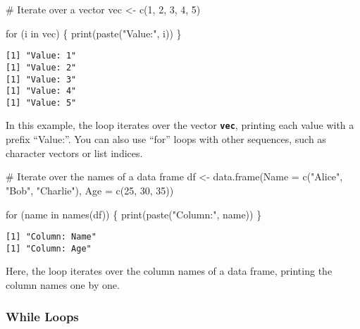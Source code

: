 \documentclass[
  letterpaper,
  DIV=11,
  numbers=noendperiod]{scrartcl}
\newenvironment{Shaded}{\begin{snugshade}}{\end{snugshade}}
\newcommand{\AttributeTok}[1]{\textcolor[rgb]{0.40,0.45,0.13}{#1}}
\newcommand{\CommentTok}[1]{\textcolor[rgb]{0.37,0.37,0.37}{#1}}
\newcommand{\ControlFlowTok}[1]{\textcolor[rgb]{0.00,0.23,0.31}{#1}}
\newcommand{\DecValTok}[1]{\textcolor[rgb]{0.68,0.00,0.00}{#1}}
\newcommand{\FunctionTok}[1]{\textcolor[rgb]{0.28,0.35,0.67}{#1}}
\newcommand{\NormalTok}[1]{\textcolor[rgb]{0.00,0.23,0.31}{#1}}
\newcommand{\OtherTok}[1]{\textcolor[rgb]{0.00,0.23,0.31}{#1}}
\newcommand{\StringTok}[1]{\textcolor[rgb]{0.13,0.47,0.30}{#1}}
\begin{document}
\begin{Shaded}
\begin{Highlighting}[]
\CommentTok{\# Iterate over a vector}
\NormalTok{vec }\OtherTok{\textless{}{-}} \FunctionTok{c}\NormalTok{(}\DecValTok{1}\NormalTok{, }\DecValTok{2}\NormalTok{, }\DecValTok{3}\NormalTok{, }\DecValTok{4}\NormalTok{, }\DecValTok{5}\NormalTok{)}

\ControlFlowTok{for}\NormalTok{ (i }\ControlFlowTok{in}\NormalTok{ vec) \{}
  \FunctionTok{print}\NormalTok{(}\FunctionTok{paste}\NormalTok{(}\StringTok{"Value:"}\NormalTok{, i))}
\NormalTok{\}}
\end{Highlighting}
\end{Shaded}

\begin{verbatim}
[1] "Value: 1"
[1] "Value: 2"
[1] "Value: 3"
[1] "Value: 4"
[1] "Value: 5"
\end{verbatim}

In this example, the loop iterates over the vector
\textbf{\texttt{vec}}, printing each value with a prefix ``Value:''. You
can also use ``for'' loops with other sequences, such as character
vectors or list indices.

\begin{Shaded}
\begin{Highlighting}[]
\CommentTok{\# Iterate over the names of a data frame}
\NormalTok{df }\OtherTok{\textless{}{-}} \FunctionTok{data.frame}\NormalTok{(}\AttributeTok{Name =} \FunctionTok{c}\NormalTok{(}\StringTok{"Alice"}\NormalTok{, }\StringTok{"Bob"}\NormalTok{, }\StringTok{"Charlie"}\NormalTok{), }\AttributeTok{Age =} \FunctionTok{c}\NormalTok{(}\DecValTok{25}\NormalTok{, }\DecValTok{30}\NormalTok{, }\DecValTok{35}\NormalTok{))}

\ControlFlowTok{for}\NormalTok{ (name }\ControlFlowTok{in} \FunctionTok{names}\NormalTok{(df)) \{}
  \FunctionTok{print}\NormalTok{(}\FunctionTok{paste}\NormalTok{(}\StringTok{"Column:"}\NormalTok{, name))}
\NormalTok{\}}
\end{Highlighting}
\end{Shaded}

\begin{verbatim}
[1] "Column: Name"
[1] "Column: Age"
\end{verbatim}

Here, the loop iterates over the column names of a data frame, printing
the column names one by one.

\hypertarget{while-loops}{%
\subsubsection{While Loops}\label{while-loops}}
\end{document}
